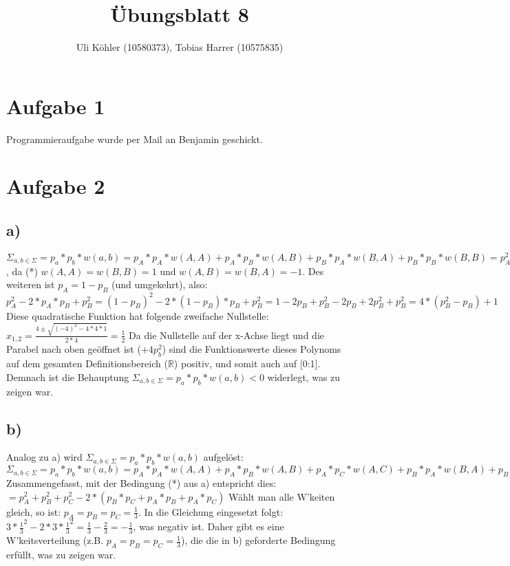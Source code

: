 \documentclass[a4paper,10pt,oneside,leqno]{scrartcl}
\title{Übungsblatt 8}
\author{Uli Köhler (10580373), Tobias Harrer (10575835)}
\begin{document}
\maketitle

\section*{Aufgabe 1}%
Programmieraufgabe wurde per Mail an Benjamin geschickt.

\section*{Aufgabe 2}%
\subsection*{a)}
$\Sigma_{a,b\in \Sigma} = p_a*p_b*w(a,b) = p_A*p_A*w(A,A) + p_A*p_B*w(A,B) + p_B*p_A*w(B,A) + 
p_B*p_B*w(B,B) = p_A^2*w(A,A) + 2*p_A*p_B + p_B^2*w(B,B) = p_A^2 - 2*p_A*p_B + p_B^2$, da (*) $w(A,A) = 
w(B,B) = 1$ und $w(A,B) = w(B,A) = -1$.\newline
Des weiteren ist $p_A = 1-p_B$ (und  umgekehrt), also:\newline
$p_A^2 - 2*p_A*p_B + p_B^2 = (1-p_B)^2 - 2*(1-p_B)*p_B + p_B^2 = 1-2p_B + p_B^2 -2p_B + 2p_B^2 + p_B^2 
= 4*(p_B^2 - p_B) + 1$\newline
Diese quadratische Funktion hat folgende zweifache Nullstelle:\newline
$x_{1,2} = \frac{4 \pm \sqrt{(-4)^2 -4*4*1}}{2*4} = \frac{1}{2}$\newline
Da die Nullstelle auf der x-Achse liegt und die Parabel nach oben geöffnet ist ($+4p_b^2$) sind die
Funktionswerte dieses Polynoms auf dem gesamten Definitionsbereich ($\mathbb{R}$) positiv, und somit auch
auf [0:1].\newline
Demnach ist die Behauptung $\Sigma_{a,b\in \Sigma} = p_a*p_b*w(a,b) < 0$ widerlegt, was zu zeigen war.

\subsection*{b)}
Analog zu a) wird $\Sigma_{a,b\in \Sigma} = p_a*p_b*w(a,b)$ aufgelöst:\newline
$\Sigma_{a,b\in \Sigma} = p_a*p_b*w(a,b) = p_A*p_A*w(A,A) + p_A*p_B*w(A,B) + p_A*p_C*w(A,C)
+ p_B*p_A*w(B,A) + p_B*p_B*w(B,B) + p_B*p_C*w(B,C)
+ p_C*p_A*w(C,A) + p_C*p_B*w(C,B) + p_C*p_C*w(C,C)$\newline
Zusammengefasst, mit der Bedingung (*) aus a) entspricht dies:\newline
$= p_A^2+p_B^2+p_C^2 - 2*(p_B*p_C + p_A*p_B + p_A*p_C)$\newline
Wählt man alle W'keiten gleich, so ist: $p_A=p_B=p_C = \frac{1}{3}$. In die Gleichung eingesetzt folgt:\newline
$3*\frac{1}{3}^2 -2*3*\frac{1}{3}^2 = \frac{1}{3} - \frac{2}{3} = -\frac{1}{3}$, was negativ ist.\newline
Daher gibt es eine W'keitsverteilung (z.B. $p_A=p_B=p_C = \frac{1}{3}$), die die in b) geforderte
Bedingung erfüllt, was zu zeigen war.
\end{document}
